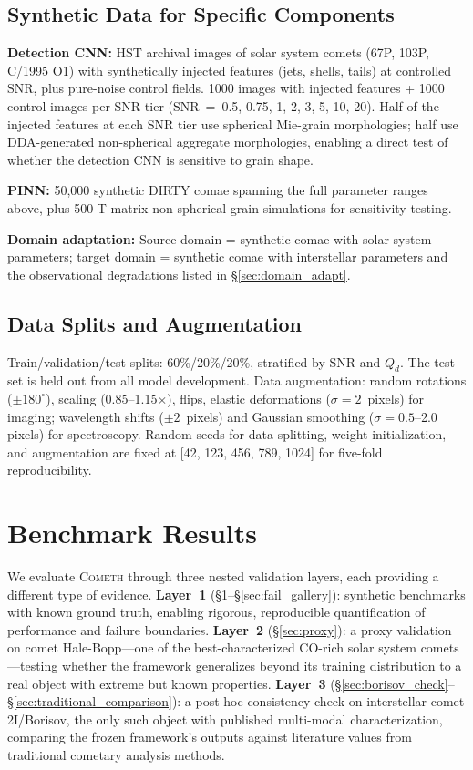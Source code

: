 \documentclass[usenatbib]{mnras}
\begin{document}
\subsection{Synthetic Data for Specific Components}

\textbf{Detection CNN:} HST archival images of solar system comets (67P, 103P, C/1995 O1) with synthetically injected features (jets, shells, tails) at controlled SNR, plus pure-noise control fields. 1000 images with injected features + 1000 control images per SNR tier (SNR~=~0.5, 0.75, 1, 2, 3, 5, 10, 20). Half of the injected features at each SNR tier use spherical Mie-grain morphologies; half use DDA-generated non-spherical aggregate morphologies, enabling a direct test of whether the detection CNN is sensitive to grain shape.

\textbf{PINN:} 50,000 synthetic DIRTY comae spanning the full parameter ranges above, plus 500 T-matrix non-spherical grain simulations for sensitivity testing.

\textbf{Domain adaptation:} Source domain = synthetic comae with solar system parameters; target domain = synthetic comae with interstellar parameters and the observational degradations listed in \S\ref{sec:domain_adapt}.

\subsection{Data Splits and Augmentation}

Train/validation/test splits: 60\%/20\%/20\%, stratified by SNR and $Q_d$. The test set is held out from all model development. Data augmentation: random rotations ($\pm 180^\circ$), scaling (0.85--1.15$\times$), flips, elastic deformations ($\sigma = 2$~pixels) for imaging; wavelength shifts ($\pm 2$~pixels) and Gaussian smoothing ($\sigma = 0.5$--2.0 pixels) for spectroscopy. Random seeds for data splitting, weight initialization, and augmentation are fixed at [42, 123, 456, 789, 1024] for five-fold reproducibility.


\section{Benchmark Results}\label{sec:results}

We evaluate \textsc{Cometh} through three nested validation layers, each providing a different type of evidence. \textbf{Layer~1} (\S\ref{sec:results}--\S\ref{sec:fail_gallery}): synthetic benchmarks with known ground truth, enabling rigorous, reproducible quantification of performance and failure boundaries. \textbf{Layer~2} (\S\ref{sec:proxy}): a proxy validation on comet Hale-Bopp---one of the best-characterized CO-rich solar system comets---testing whether the framework generalizes beyond its training distribution to a real object with extreme but known properties. \textbf{Layer~3} (\S\ref{sec:borisov_check}--\S\ref{sec:traditional_comparison}): a post-hoc consistency check on interstellar comet 2I/Borisov, the only such object with published multi-modal characterization, comparing the frozen framework's outputs against literature values from traditional cometary analysis methods.
\end{document}
